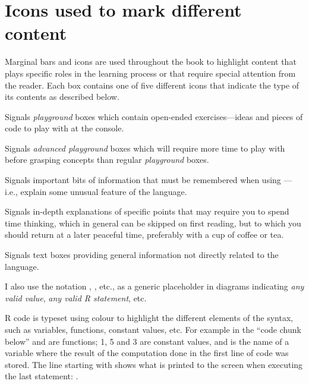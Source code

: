 \section*{Icons used to mark different content}

Marginal bars and icons are used throughout the book to highlight content that plays specific roles in the learning process or that require special attention from the reader. Each box contains one of five different icons that indicate the type of its contents as described below.

\begin{playground}
Signals \emph{playground} boxes which contain open-ended exercises---ideas and pieces of \Rlang code to play with at the \Rlang console.
\end{playground}

\begin{advplayground}
Signals \emph{advanced playground} boxes which will require more time to play with before grasping concepts than regular \emph{playground} boxes.
\end{advplayground}

\begin{warningbox}
Signals important bits of information that must be remembered when using \Rlang---i.e., explain some unusual feature of the language.
\end{warningbox}

\begin{explainbox}
Signals in-depth explanations of specific points that may require you to spend time thinking, which in general can be skipped on first reading, but to which you should return at a later peaceful time, preferably with a cup of coffee or tea.
\end{explainbox}

\begin{infobox}
Signals text boxes providing general information not directly related to the \Rlang language.
\end{infobox}

I also use the notation \textcolor{blue}{},  \textcolor{blue}{}, etc., as a generic placeholder in diagrams indicating \emph{any valid value}, \emph{any valid R statement}, etc.

R code is typeset using colour to highlight the different elements of the syntax, such as variables, functions, constant values, etc. For example in the ``code chunk below''  and  are functions; 1, 5 and 3 are constant values, and  is the name of a variable where the result of the computation done in the first line of code was stored. The line starting with \code{\#\# } shows what is printed to the screen when executing the last statement: .

